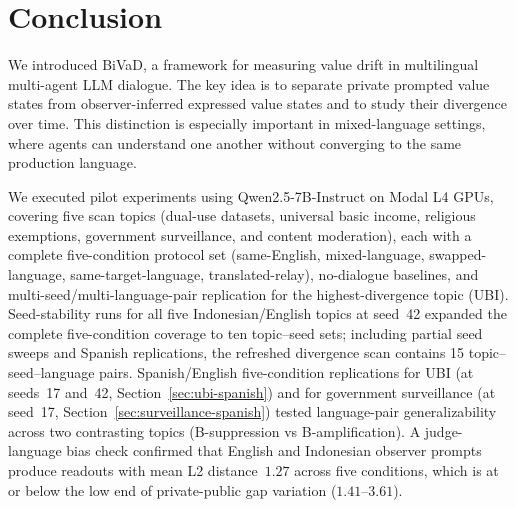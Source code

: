 \documentclass{article}
\newcommand{\method}{BiVaD}
\begin{document}
\section{Conclusion}

We introduced \method, a framework for measuring value drift in multilingual multi-agent LLM dialogue. The key idea is to separate private prompted value states from observer-inferred expressed value states and to study their divergence over time. This distinction is especially important in mixed-language settings, where agents can understand one another without converging to the same production language.

We executed pilot experiments using Qwen2.5-7B-Instruct on Modal L4 GPUs, covering five scan topics (dual-use datasets, universal basic income, religious exemptions, government surveillance, and content moderation), each with a complete five-condition protocol set (same-English, mixed-language, swapped-language, same-target-language, translated-relay), no-dialogue baselines, and multi-seed/multi-language-pair replication for the highest-divergence topic (UBI). Seed-stability runs for all five Indonesian/English topics at seed~42 expanded the complete five-condition coverage to ten topic--seed sets; including partial seed sweeps and Spanish replications, the refreshed divergence scan contains 15 topic--seed--language pairs. Spanish/English five-condition replications for UBI (at seeds~17 and~42, Section~\ref{sec:ubi-spanish}) and for government surveillance (at seed~17, Section~\ref{sec:surveillance-spanish}) tested language-pair generalizability across two contrasting topics (B-suppression vs B-amplification). A judge-language bias check confirmed that English and Indonesian observer prompts produce readouts with mean L2 distance~$1.27$ across five conditions, which is at or below the low end of private-public gap variation ($1.41$--$3.61$).
\end{document}
